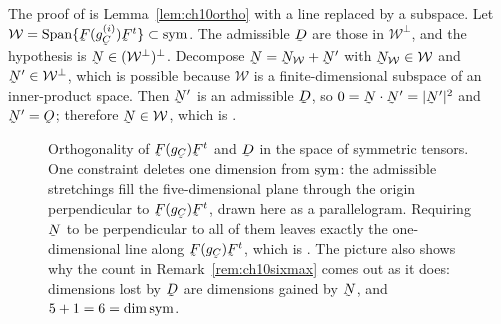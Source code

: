 The proof of  is Lemma~\ref{lem:ch10ortho} with a line
replaced by a subspace. Let $\mathcal{W}=\mathrm{Span}
\{\bF(g^{(i)}_{\bC})\bF^{t}\}\subset\Sym$. The admissible $\bD$ are those
in $\mathcal{W}^{\perp}$, and the hypothesis is
$\bN\in(\mathcal{W}^{\perp})^{\perp}$. Decompose
$\bN=\bN_{\mathcal{W}}+\bN'$ with $\bN_{\mathcal{W}}\in\mathcal{W}$ and
$\bN'\in\mathcal{W}^{\perp}$, which is possible because $\mathcal{W}$ is
a finite-dimensional subspace of an inner-product space. Then $\bN'$ is
an admissible $\bD$, so $0=\bN\cdot\bN'=|\bN'|^{2}$ and $\bN'=\Ob$;
therefore $\bN\in\mathcal{W}$, which is .

\begin{figure}[htbp]\centering
{}
\caption{Orthogonality of $\bF(g_{\bC})\bF^{t}$ and $\bD$ in the space of
symmetric tensors. One constraint deletes one dimension from $\operatorname{sym}$: the
admissible stretchings fill the five-dimensional plane through the origin
perpendicular to $\bF(g_{\bC})\bF^{t}$, drawn here as a parallelogram.
Requiring $\bN$ to be perpendicular to all of them leaves exactly the
one-dimensional line along $\bF(g_{\bC})\bF^{t}$, which is .
The picture also shows why the count in Remark~\ref{rem:ch10sixmax} comes
out as it does: dimensions lost by $\bD$ are dimensions gained by $\bN$,
and $5+1=6=\dim\operatorname{sym}$.}
\label{fig:ch10ortho}
\end{figure}

